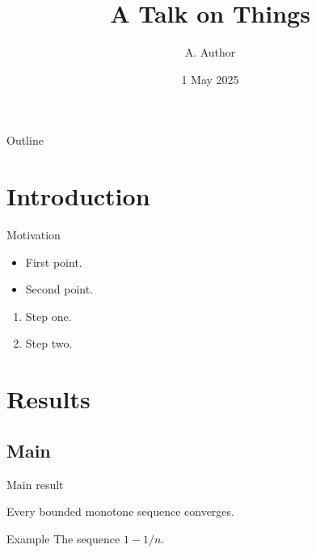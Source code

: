 \documentclass{beamer}
\title[Short]{A Talk on Things}
\author{A. Author}
\institute{Institute}
\date{1 May 2025}
\begin{document}
\begin{frame}
\titlepage
\end{frame}
\begin{frame}{Outline}
\tableofcontents
\end{frame}
\section{Introduction}
\begin{frame}{Motivation}
\begin{itemize}
\item First point.
\item Second point.
\end{itemize}
\begin{enumerate}
\item Step one.
\item Step two.
\end{enumerate}
\end{frame}
\section{Results}
\subsection{Main}
\begin{frame}{Main result}
\begin{theorem}
Every bounded monotone sequence converges.
\end{theorem}
\begin{exampleblock}{Example}
The sequence $1 - 1/n$.
\end{exampleblock}
\end{frame}
\end{document}
